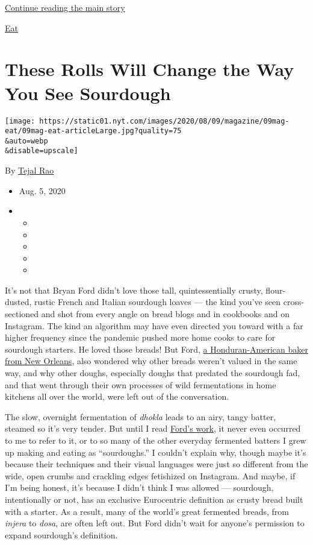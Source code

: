 \protect\hyperlink{after-sponsor}{Continue reading the main story}

\href{/column/magazine-eat}{Eat}

\hypertarget{these-rolls-will-change-the-way-you-see-sourdough}{%
\section{These Rolls Will Change the Way You See
Sourdough}\label{these-rolls-will-change-the-way-you-see-sourdough}}

\texttt{[image: https://static01.nyt.com/images/2020/08/09/magazine/09mag-eat/09mag-eat-articleLarge.jpg?quality=75\\\&auto=webp\\\&disable=upscale]}

By \href{https://www.nytimes.com/by/tejal-rao}{Tejal Rao}

\begin{itemize}
\item
  Aug. 5, 2020
\item
  \begin{itemize}
  \item
  \item
  \item
  \item
  \item
  \end{itemize}
\end{itemize}

It's not that Bryan Ford didn't love those tall, quintessentially
crusty, flour-dusted, rustic French and Italian sourdough loaves --- the
kind you've seen cross-sectioned and shot from every angle on bread
blogs and in cookbooks and on Instagram. The kind an algorithm may have
even directed you toward with a far higher frequency since the pandemic
pushed more home cooks to care for sourdough starters. He loved those
breads! But Ford, \href{https://www.instagram.com/artisanbryan/}{a
Honduran-American baker from New Orleans}, also wondered why other
breads weren't valued in the same way, and why other doughs, especially
doughs that predated the sourdough fad, and that went through their own
processes of wild fermentations in home kitchens all over the world,
were left out of the conversation.

The slow, overnight fermentation of \emph{dhokla} leads to an airy,
tangy batter, steamed so it's very tender. But until I read
\href{https://www.artisanbryan.com/}{Ford's work}, it never even
occurred to me to refer to it, or to so many of the other everyday
fermented batters I grew up making and eating as ``sourdoughs.'' I
couldn't explain why, though maybe it's because their techniques and
their visual languages were just so different from the wide, open crumbs
and crackling edges fetishized on Instagram. And maybe, if I'm being
honest, it's because I didn't think I was allowed --- sourdough,
intentionally or not, has an exclusive Eurocentric definition as crusty
bread built with a starter. As a result, many of the world's great
fermented breads, from \emph{injera} to \emph{dosa}, are often left out.
But Ford didn't wait for anyone's permission to expand sourdough's
definition.

